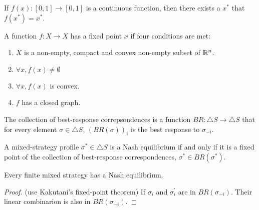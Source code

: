 \begin{theorem}
    If $f(x): [0,1] \rightarrow [0,1]$ is a continuous function, then there exists a $x^*$ that $f(x^*) = x^*$.
\end{theorem}

\begin{theorem}
    A function $f: X \rightarrow X$ has a fixed point $x$ if four conditions are met:
    \begin{enumerate}
        \item $X$ is a non-empty, compact and convex non-empty subset of $\mathbb{R}^n$.
        \item $\forall x, f(x) \neq \emptyset$
        \item $\forall x, f(x)$ is convex.
        \item $f$ has a closed graph.
    \end{enumerate}
\end{theorem}

\begin{definition}
    The collection of best-response correpsondences is a function $BR: \bigtriangleup S \rightarrow \bigtriangleup S$ that for every element $\sigma \in \bigtriangleup S$, $\left(BR(\sigma)\right)_i$ is the best response to $\sigma_{-i}$.
\end{definition}

\begin{theorem}
    A mixed-strategy profile $\sigma^* \in \bigtriangleup S$ is a Nash equilibrium if and only if it is a fixed point of the collection of best-response correspondences, $\sigma^* \in BR(\sigma^*)$.
\end{theorem}

\begin{theorem}
    Every finite mixed strategy has a Nash equilibrium.    
\end{theorem}
\begin{proof}(use Kakutani's fixed-point theorem)
    If $\sigma_i$ and $\sigma_i^{'}$ are in $BR(\sigma_{-i})$. Their linear combinarion is also in $BR(\sigma_{-i})$.
\end{proof}













